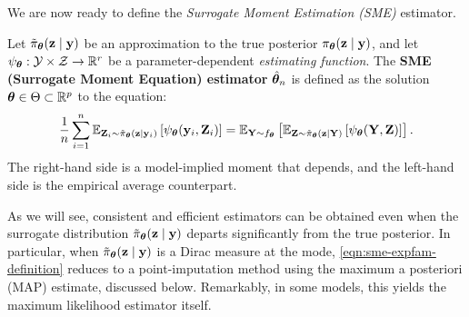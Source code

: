 \documentclass[twoside,11pt]{article}
\begin{document}
We are now ready to define the \emph{Surrogate Moment Estimation (SME)} estimator.
%

\begin{tcolorbox}[colback=blue!3!white,colframe=blue!70!black,title=SME General Definition]
\begin{definition}
Let \( \tilde\pi_{\bm{\theta}}({\bf z} \mid {\bf y}) \) be an approximation to the true posterior \( \pi_{\bm{\theta}}({\bf z} \mid {\bf y}) \), and let \( \psi_{\bm{\theta}} : \mathcal{Y} \times \mathcal{Z} \to \mathbb{R}^r \) be a parameter-dependent \emph{estimating function}. The \textbf{SME (Surrogate Moment Equation) estimator} \( \hat{{\bm{\theta}}}_n \) is defined as the solution \( {\bm{\theta}} \in \Theta \subset \mathbb{R}^p \) to the equation:
\begin{equation}
\label{eqn:general-sme}
\frac{1}{n} \sum_{i=1}^n 
\mathbb{E}_{{\bf Z}_i \sim \tilde\pi_{\bm{\theta}}({\bf z} \mid {\bf y}_i)} 
\left[
\psi_{\bm{\theta}}({\bf y}_i, {\bf Z}_i)
\right]
=
\mathbb{E}_{{\bf Y} \sim f_{\bm{\theta}}}
\left[
\mathbb{E}_{{\bf Z} \sim \tilde\pi_{\bm{\theta}}({\bf z} \mid {\bf Y})} 
\left[
\psi_{\bm{\theta}}({\bf Y}, {\bf Z})
\right]
\right].
\end{equation}
The right-hand side is a model-implied moment that depends, and the left-hand side is the empirical average counterpart.
\end{definition}
\end{tcolorbox}
As we will see, consistent and efficient estimators can be obtained even when the surrogate distribution \( \tilde\pi_{\bm{\theta}}({\bf z} \mid {\bf y}) \) departs significantly from the true posterior. In particular, when \( \tilde\pi_{\bm{\theta}}({\bf z} \mid {\bf y}) \) is a Dirac measure at the mode, \eqref{eqn:sme-expfam-definition} reduces to a point-imputation method using the maximum a posteriori (MAP) estimate, discussed below. Remarkably, in some models, this yields the maximum likelihood estimator itself.
\end{document}
